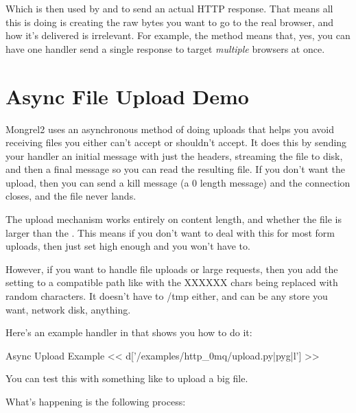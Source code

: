 Which is then used by  and
 to send an actual HTTP response.  That
means all this is doing is creating the raw bytes you want to go
to the real browser, and how it's delivered is irrelevant.  For example,
the  method means that, yes, you can have one
handler send a single response to target \emph{multiple} browsers
at once.


\section{Async File Upload Demo}

Mongrel2 uses an asynchronous method of doing uploads that helps you 
avoid receiving files you either can't accept or shouldn't accept.  It does
this by sending your handler an initial message with just the headers, streaming
the file to disk, and then a final message so you can read the resulting file.
If you don't want the upload, then you can send a kill message (a 0 length message)
and the connection closes, and the file never lands.

The upload mechanism works entirely on content length, and whether the file
is larger than the .  This means if you don't
want to deal with this for most form uploads, then just set 
high enough and you won't have to.

However, if you want to handle file uploads or large requests, then you add
the setting  to a  compatible path
like  with the XXXXXX chars being replaced
with random characters.  It doesn't have to /tmp either, and can be any store
you want, network disk, anything.

Here's an example handler in  that shows
you how to do it:

\begin{code}{Async Upload Example}
<< d['/examples/http_0mq/upload.py|pyg|l'] >>
\end{code}

You can test this with something like
 to upload a big file.

What's happening is the following process:

